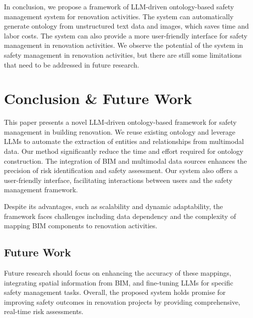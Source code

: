 In conclusion, we propose a framework of LLM-driven ontology-based safety management system for renovation activities.
The system can automatically generate ontology from unstructured text data and images, which saves time and labor costs.
The system can also provide a more user-friendly interface for safety management in renovation activities.
We observe the potential of the system in safety management in renovation activities, but there are still some limitations that need to be addressed in future research.

\section{Conclusion \& Future Work}
\label{sec:conclusion}
This paper presents a novel LLM-driven ontology-based framework for safety management in building renovation. 
We reuse existing ontology and leverage LLMs to automate the extraction of entities and relationships from multimodal data. 
Our method significantly reduce the time and effort required for ontology construction.
 The integration of BIM and multimodal data sources enhances the precision of risk identification and safety assessment. 
 Our system also offers a user-friendly interface, 
 facilitating interactions between users and the safety management framework.

Despite its advantages, 
such as scalability and dynamic adaptability, 
the framework faces challenges including data dependency and the complexity of mapping BIM components to renovation activities. 
\subsection{Future Work}
Future research should focus on enhancing the accuracy of these mappings, 
integrating spatial information from BIM, and fine-tuning LLMs for specific safety management tasks.
 Overall, the proposed system holds promise for improving safety outcomes in renovation projects by providing comprehensive, 
 real-time risk assessments.